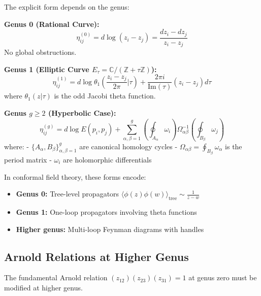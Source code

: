 The explicit form depends on the genus:

\textbf{Genus 0 (Rational Curve):}
\begin{equation}
\eta_{ij}^{(0)} = d\log(z_i - z_j) = \frac{dz_i - dz_j}{z_i - z_j}
\end{equation}
No global obstructions.

\textbf{Genus 1 (Elliptic Curve $E_\tau = \mathbb{C}/(\mathbb{Z} + \tau\mathbb{Z})$):}
\begin{equation}
\eta_{ij}^{(1)} = d\log \theta_1\left(\frac{z_i - z_j}{2\pi} \Big| \tau\right) + \frac{2\pi i}{\text{Im}(\tau)}(z_i - z_j) d\tau
\end{equation}
where $\theta_1(z|\tau)$ is the odd Jacobi theta function.

\textbf{Genus $g \geq 2$ (Hyperbolic Case):}
\begin{equation}
\eta_{ij}^{(g)} = d\log E(p_i, p_j) + \sum_{\alpha, \beta = 1}^g \left(\oint_{A_\alpha} \omega_i\right) \Omega_{\alpha\beta}^{-1} \left(\oint_{B_\beta} \omega_j\right)
\end{equation}
where:
- $\{A_\alpha, B_\beta\}_{\alpha,\beta=1}^g$ are canonical homology cycles
- $\Omega_{\alpha\beta} = \oint_{B_\beta} \omega_\alpha$ is the period matrix
- $\omega_i$ are holomorphic differentials

\begin{remark}
\label{rem:physical-log-forms}
In conformal field theory, these forms encode:
\begin{itemize}
\item \textbf{Genus 0:} Tree-level propagators $\langle \phi(z)\phi(w) \rangle_{\text{tree}} \sim \frac{1}{z-w}$
\item \textbf{Genus 1:} One-loop propagators involving theta functions
\item \textbf{Higher genus:} Multi-loop Feynman diagrams with handles
\end{itemize}
\end{remark}

\subsection{Arnold Relations at Higher Genus}

The fundamental Arnold relation $(z_{12})(z_{23})(z_{31}) = 1$ at genus zero must be modified at higher genus.

